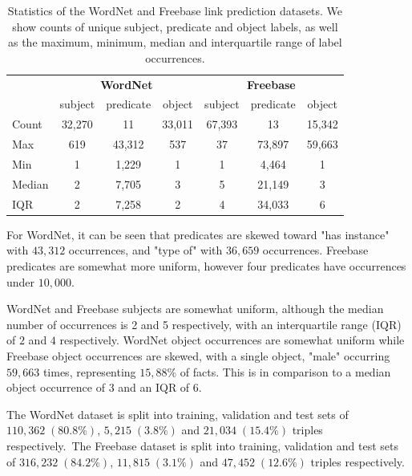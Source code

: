 \begin{table}[H]
	\begin{center}
	\begin{tabular}{|l|ccc|ccc|}
		\hline
 		& \multicolumn{3}{c|}{\textbf{WordNet}} & \multicolumn{3}{c|}{\textbf{Freebase}} \\
		& subject & predicate & object & subject & predicate & object \\
		\hline 
		Count & 32,270 & 11 & 33,011 & 67,393 & 13 & 15,342 \\
		Max & 619 & 43,312 & 537 & 37 & 73,897 & 59,663 \\
		Min & 1 & 1,229 & 1 & 1 & 4,464 & 1 \\
		Median & 2 & 7,705 & 3 & 5 & 21,149 & 3 \\
		IQR & 2 & 7,258 & 2 & 4 & 34,033 & 6 \\
		\hline 
	\end{tabular}
	\end{center}
	\captionsetup{justification=centering}
	\caption{Statistics of the WordNet and Freebase link prediction datasets. We show counts of unique subject, predicate and object labels, as well as the maximum, minimum, median and interquartile range of label occurrences.}
\end{table}

\noindent For WordNet, it can be seen that predicates are skewed toward "has instance" with $ 43, 312 $ occurrences, and "type of" with $ 36, 659 $ occurrences. Freebase predicates are somewhat more uniform, however four predicates have occurrences under $ 10, 000 $. \par

\noindent WordNet and Freebase subjects are somewhat uniform, although the median number of occurrences is 2 and 5 respectively, with an interquartile range (IQR) of $ 2 $ and $ 4 $ respectively. WordNet object occurrences are somewhat uniform while Freebase object occurrences are skewed, with a single object, "male" occurring $ 59, 663 $ times, representing $15, 88\% $ of facts. This is in comparison to a median object occurrence of $ 3 $ and an IQR of $ 6 $. \par

\noindent The WordNet dataset is split into training, validation and test sets of $ 110, 362 \; (80.8 \%) $, $ 5, 215 \; (3.8 \%) $ and $ 21, 034 \; (15.4 \%) $ triples respectively.\ The Freebase dataset is split into training, validation and test sets of $ 316, 232 \; (84.2 \%) $, $ 11, 815 \; (3.1 \%) $ and $ 47, 452 \; (12.6 \%) $ triples respectively. 

